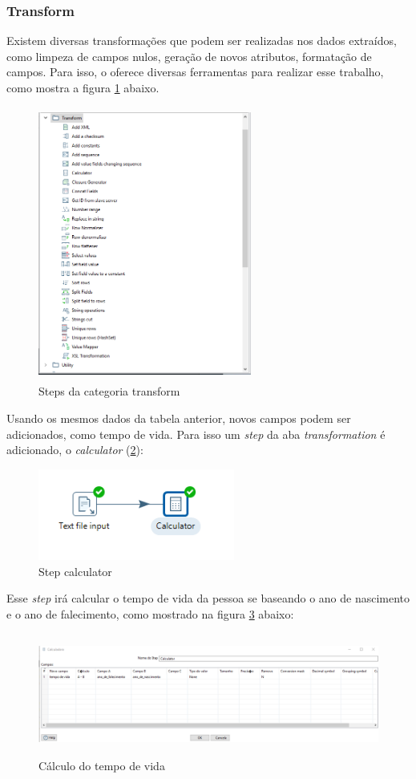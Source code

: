 \subsubsection{Transform}
Existem diversas transformações que podem ser realizadas nos dados extraídos, como limpeza de campos nulos, geração de novos atributos, formatação de campos. Para isso, o \pdi oferece diversas ferramentas para realizar esse trabalho, como mostra a figura \ref{transformsteps} abaixo.
\begin{figure}[H]
\centering
\includegraphics[width=7cm, height=9cm]{imagens/transforms.png}
\caption{Steps da categoria transform}
\label{transformsteps}
\end{figure}
Usando os mesmos dados da tabela anterior, novos campos podem ser adicionados, como tempo de vida. Para isso um \textit{step} da aba \textit{transformation} é adicionado, o \textit{calculator} (\ref{calculator}):
\begin{figure}[H]
\centering
\includegraphics[height=3cm]{imagens/calc.png}
\caption{Step calculator}
\label{calculator}
\end{figure}
Esse \textit{step} irá calcular o tempo de vida da pessoa se baseando o ano de nascimento e o ano de falecimento, como mostrado na figura \ref{timespan} abaixo:
\begin{figure}[H]
\centering
\includegraphics[height=4cm]{imagens/tempovida.png}
\caption{Cálculo do tempo de vida}
\label{timespan}
\end{figure}

